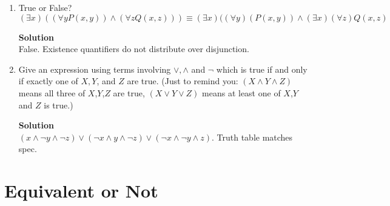 \documentclass[11pt]{article}
\newcommand*{\Question}[1]{\vfill\pagebreak[3]\section{#1}}
\begin{document}
\begin{enumerate}
\item True or False? \\
$(\exists x) ((\forall y P(x,y)) \land (\forall z Q(x,z))) \equiv (\exists x) ((\forall y) (P(x,y)) \land (\exists x)(\forall z) Q(x,z)$

\begin{mdframed} \textbf{Solution} \\
False. Existence quantifiers do not distribute over disjunction.
\end{mdframed}

\item
Give an expression using terms involving $\lor,\land$ and $\neg$ which is true if and only if
exactly one of $X,Y$, and $Z$ are true.  (Just to remind you: $(X \land Y \land Z)$ means
all three of $X$,$Y$,$Z$ are true, $(X \lor Y \lor Z)$ means at least one of $X$,$Y$
and $Z$ is true.)

\begin{mdframed} \textbf{Solution} \\
$(x\land \neg y \land \neg z) \lor (\neg x \land y \land \neg z) \lor (\neg x \land \neg y \land z)$. Truth table matches spec.
\end{mdframed}
    
\end{enumerate}


\Question{Equivalent or Not}
\end{document}
